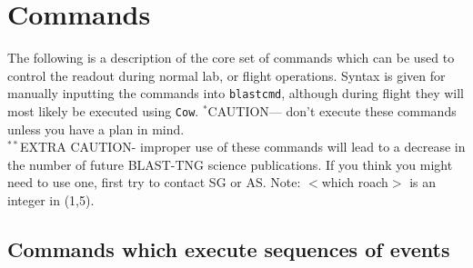\section{Commands}\label{commands}
The following is a description of the core set of commands which can be used to control the readout during normal lab, or flight operations. Syntax is given for manually inputting the commands into \texttt{blastcmd}, although during flight they will most likely be executed using \texttt{Cow}.\newline\newline
$^{*}$CAUTION--- don’t execute these commands unless you have a plan in mind.\\
$^{**}$EXTRA CAUTION- improper use of these commands will lead to a decrease in the number of future BLAST-TNG science publications. If you think you might need to use one, first try to contact SG or AS\@.\newline\newline
Note: $<$which roach$>$ is an integer in (1,5).

\subsection{Commands which execute sequences of events}

